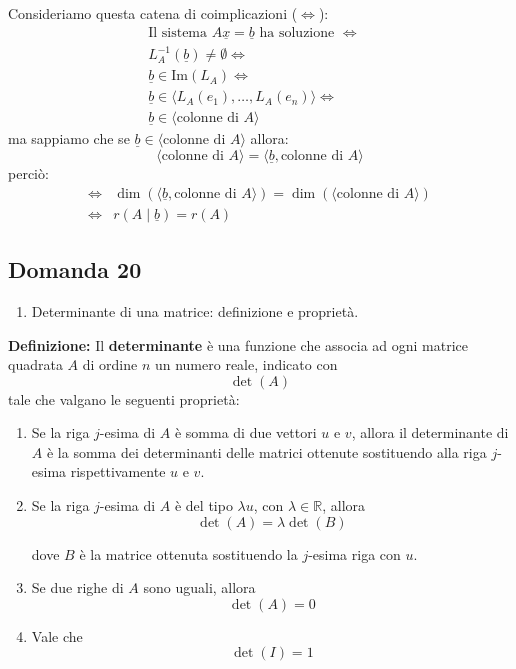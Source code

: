 \documentclass[
  a4paper,
]{article}
\providecommand{\tightlist}{%
  \setlength{\itemsep}{0pt}\setlength{\parskip}{0pt}}
\providecommand{\tightlist}{}
\begin{document}
Consideriamo questa catena di coimplicazioni (\(\iff\)): \[
\begin{aligned}
\text{Il sistema } A\underline{x} = \underline{b} \text{ ha soluzione }\iff& \\
L_A^{-1}(\underline{b}) \not = \emptyset \iff&\\
\underline{b} \in \text{Im}(L_A) \iff&\\
\underline{b} \in \langle L_A (e_1), \dots, L_A(e_n) \rangle \iff& \\
\underline{b} \in \langle \text{colonne di } A \rangle
\end{aligned}
\] ma sappiamo che se
\(\underline{b} \in \langle \text{colonne di } A \rangle\) allora: \[
\langle \text{colonne di } A \rangle = \langle \underline{b}, \text{colonne di } A \rangle
\] perciò: \[
\begin{aligned}
\iff& \dim(\langle \underline{b},  \text{colonne di } A \rangle)  =\dim(\langle \text{colonne di } A \rangle) \\
\iff& r(A \mid \underline{b}) = r(A)
\end{aligned}
\]

\hypertarget{domanda-20}{%
\subsection{Domanda 20}\label{domanda-20}}

\begin{observationbox}[Domanda]
\begin{enumerate}
\def\labelenumi{\arabic{enumi}.}
\setcounter{enumi}{19}
\tightlist
\item
  Determinante di una matrice: definizione e proprietà.
\end{enumerate}
\end{observationbox}

\textbf{Definizione:} Il \textbf{determinante} è una funzione che
associa ad ogni matrice quadrata \(A\) di ordine \(n\) un numero reale,
indicato con \[
\det(A)
\] tale che valgano le seguenti proprietà:

\begin{enumerate}
\def\labelenumi{\arabic{enumi}.}
\item
  Se la riga \(j\)-esima di \(A\) è somma di due vettori \(u\) e \(v\),
  allora il determinante di \(A\) è la somma dei determinanti delle
  matrici ottenute sostituendo alla riga \(j\)-esima rispettivamente
  \(u\) e \(v\).
\item
  Se la riga \(j\)-esima di \(A\) è del tipo \(\lambda u\), con
  \(\lambda \in \mathbb{R}\), allora \[
  \det(A) = \lambda \det(B)
  \]

  dove \(B\) è la matrice ottenuta sostituendo la \(j\)-esima riga con
  \(u\).
\item
  Se due righe di \(A\) sono uguali, allora \[
  \det(A)=0
  \]
\item
  Vale che \[
  \det(I)=1
  \]
\end{enumerate}
\end{document}
